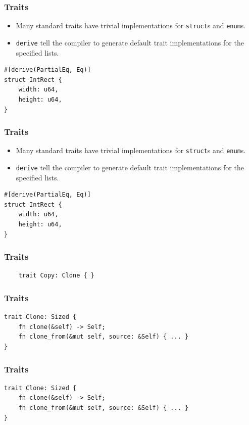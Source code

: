 \begin{frame}[fragile]
    \frametitle{Traits}
    \begin{itemize}
        \item Many standard traits have trivial implementations for \texttt{struct}s and \texttt{enum}s.
        \item \texttt{derive} tell the compiler to generate default trait implementations for the specified lists.
    \end{itemize}
    \pause
    \vfill
    \begin{verbatim}
#[derive(PartialEq, Eq)]
struct IntRect {
    width: u64,
    height: u64,
}
    \end{verbatim}
\end{frame}

\begin{frame}[fragile]
    \frametitle{Traits}
    \begin{itemize}
        \item Many standard traits have trivial implementations for \texttt{struct}s and \texttt{enum}s.
        \item \texttt{derive} tell the compiler to generate default trait implementations for the specified lists.
    \end{itemize}
    \pause
    \vfill
    \begin{verbatim}
#[derive(PartialEq, Eq)]
struct IntRect {
    width: u64,
    height: u64,
}
    \end{verbatim}
\end{frame}

\begin{frame}[fragile]
    \frametitle{Traits}
    \begin{verbatim}
    trait Copy: Clone { }
    \end{verbatim}
\end{frame}

\begin{frame}[fragile]
    \frametitle{Traits}
    \begin{verbatim}
trait Clone: Sized {
    fn clone(&self) -> Self;
    fn clone_from(&mut self, source: &Self) { ... }
}
    \end{verbatim}
\end{frame}

\begin{frame}[fragile]
    \frametitle{Traits}
    \begin{verbatim}
trait Clone: Sized {
    fn clone(&self) -> Self;
    fn clone_from(&mut self, source: &Self) { ... }
}
    \end{verbatim}
\end{frame}

